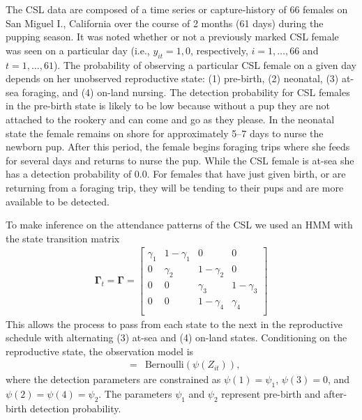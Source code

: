 \documentclass[12pt,english]{article}
\begin{document}
\begin{spacing}{1.9}
 The CSL data are composed of a time series or capture-history of 66 females on San Miguel I., California over the course of 2 months (61 days) during the pupping season. It was noted whether or not a previously marked CSL female was seen on a particular day (i.e., $y_{it} =1,0$, respectively, $i=1,\dots,66$ and $t=1,\dots,61$). The probability of observing a particular CSL female on a given day depends on her unobserved reproductive state: (1) pre-birth, (2) neonatal, (3) at-sea foraging, and (4) on-land nursing. The detection probability for CSL females in the pre-birth state is likely to be low because without a pup they are not attached to the rookery and can come and go as they please. In the neonatal state the female remains on shore for approximately 5--7 days to nurse the newborn pup. After this period, the female begins foraging trips where she feeds for several days and returns to nurse the pup. While the CSL female is at-sea she has a detection probability of 0.0. For females that have just given birth, or are returning from a foraging trip, they will be tending to their pups and are more available to be detected.

To make inference on the attendance patterns of the CSL we used an HMM with the state transition matrix
\begin{eqnarray*}
\boldsymbol{\Gamma}_t = \boldsymbol{\Gamma} =
\left[ {\begin{array}{cccc}
  \gamma_1 & 1-\gamma_1 & 0 & 0 \\
  0 & \gamma_2 & 1-\gamma_2 & 0 \\
  0 & 0 & \gamma_3 & 1-\gamma_3 \\
  0 & 0 & 1-\gamma_4 & \gamma_4 \\
  \end{array} } \right]
\end{eqnarray*}
 This allows the process to pass from each state to the next in the reproductive schedule with alternating (3) at-sea and (4) on-land states. Conditioning on the reproductive state, the observation model is
 \begin{eqnarray*}
 [y_{it}|Z_{it}] & = & \text{Bernoulli}(\psi(Z_{it})),
 \end{eqnarray*}
 where the detection parameters are constrained as $\psi(1) = \psi_1$, $\psi(3) = 0$, and $\psi(2) = \psi(4) = \psi_2$. The parameters $\psi_1$ and $\psi_2$ represent pre-birth and after-birth detection probability.


\end{spacing}
\end{document}

